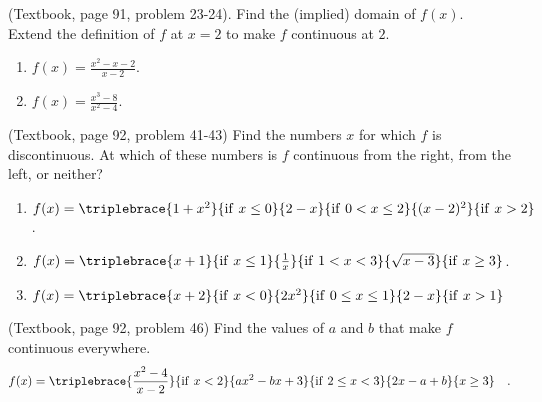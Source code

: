 \begin{problem}
(Textbook, page 91, problem 23-24). Find the (implied) domain of $f(x)$. Extend the definition of $f$ at $x=2$ to make $f$ continuous at $2$.
\begin{multicols}{2}
\begin{enumerate}
\item $f(x)=\frac{x^2-x-2}{x-2}$.
\item $f(x)=\frac{x^3-8}{x^2-4}$.
\end{enumerate}
\end{multicols}
\end{problem}
\begin{problem}(Textbook, page 92, problem 41-43)
Find the numbers $x$ for which $f$ is discontinuous. At which of these numbers is $f$ continuous from the right, from the left, or neither? 
\begin{multicols}{2}
\begin{enumerate}
\item $f(x)=\triplebrace{1+x^2}{\mathrm{if~} x\leq 0 } {2-x}{\mathrm{if~} 0<x\leq 2}{(x-2)^2}{\mathrm{if~} x>2}$.
\item $f(x)=\triplebrace{x+1}{\mathrm{if~} x\leq 1 }{\frac{1}{x}}{\mathrm{if~}1<x<3}{\sqrt{x-3}}{\mathrm{if~} x\geq 3}$.
\item $f(x)=\triplebrace{x+2}{\mathrm{if~} x<0}{2x^2}{\mathrm{if~} 0\leq x\leq 1 }{2-x}{\mathrm{if~}x>1 }$
\end{enumerate}
\end{multicols}
\end{problem}
\begin{problem} (Textbook, page 92, problem 46)
Find the values of $a$ and $b$ that make $f$ continuous everywhere.
\[f(x)=\triplebrace{\frac{x^2-4}{x-2}}{\mathrm{if~}x<2}{ax^2-bx+3}{\mathrm{if~}2\leq x<3}{2x-a+b}{x\geq 3} \quad .\]
\end{problem}
